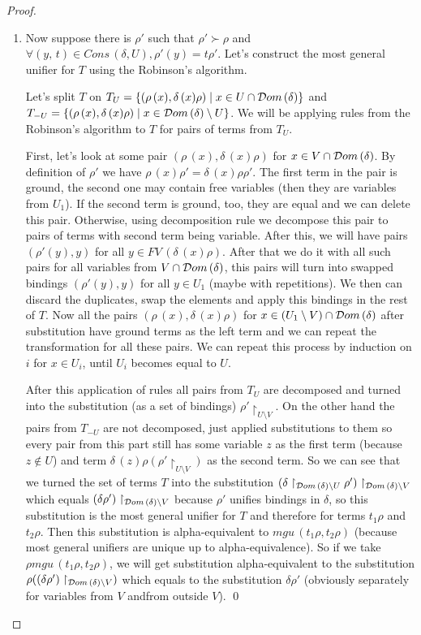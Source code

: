 \begin{proof}
\begin{enumerate}
\item Now suppose there is $\rho'$ such that $\rho' \succ \rho$ and $\forall (y, \, t) \in Cons\,(\delta, U), \rho'(y) = t \rho'$. Let's construct the most general unifier for $T$ using the Robinson's algorithm.

Let's split $T$ on $T_U = \{ (\rho\,(x), \delta\,(x) \rho) \mid x \in U \cap \mathcal{D}om\,(\delta) \}$ and $T_{-U} = \{ (\rho\,(x), \delta\,(x) \rho) \mid x \in  \mathcal{D}om\,(\delta) \setminus U \}$. We will be applying rules from the Robinson's algorithm to $T$ for pairs of terms from $T_U$.

First, let's look at some pair $(\rho\,(x), \delta\,(x) \rho)$ for $x \in V \cap \mathcal{D}om\,(\delta)$. By definition of $\rho'$ we have $\rho\,(x) \rho' = \delta\,(x) \rho \rho'$. The first term in the pair is ground, the second one may contain free variables (then they are variables from $U_1$). If the second term is ground, too, they are equal and we can delete this pair. Otherwise, using decomposition rule we decompose this pair to pairs of terms with second term being variable. After this, we will have pairs $(\rho'(y), y)$ for all $y \in FV\,(\delta\,(x) \rho)$. After that we do it with all such pairs for all variables from $V \cap \mathcal{D}om\,(\delta)$, this pairs will turn into swapped bindings $(\rho'(y), y)$ for all $y \in U_1$ (maybe with repetitions). We then can discard the duplicates, swap the elements and apply this bindings in the rest of $T$. Now all the pairs $(\rho\,(x), \delta\,(x) \rho)$ for $x \in (U_1 \setminus V) \cap \mathcal{D}om\,(\delta)$ after substitution have ground terms as the left term and we can repeat the transformation for all these pairs. We can repeat this process by induction on $i$ for $x \in U_i$, until $U_i$ becomes equal to $U$.

After this application of rules all pairs from $T_U$ are decomposed and turned into the substitution (as a set of bindings) $\rho'\restriction_{U \setminus V}$. On the other hand the pairs from $T_{-U}$  are not decomposed, just applied substitutions to them so every pair from this part still has some variable $z$ as the first term (because $z\not\in U$) and term $\delta\,(z) \rho (\rho'\restriction_{U \setminus V})$ as the second term. So we can see that we turned the set of terms $T$ into the substitution ${(\delta\restriction_{\mathcal{D}om\,(\delta) \setminus U} \rho')\restriction_{\mathcal{D}om\,(\delta) \setminus V}}$ which equals ${(\delta \rho')\restriction_{\mathcal{D}om\,(\delta) \setminus V}}$ because $\rho'$ unifies bindings in $\delta$, so this substitution is the most general unifier for $T$ and therefore for terms $t_1 \rho$ and $t_2 \rho$. Then this substitution is alpha-equivalent to $mgu\,(t_1 \rho, t_2 \rho)$ (because most general unifiers are unique up to alpha-equivalence). So if we take $\rho mgu\,(t_1 \rho, t_2 \rho)$, we will get substitution alpha-equivalent to the substitution ${\rho ((\delta \rho')\restriction_{\mathcal{D}om\,(\delta) \setminus V})}$ which equals to the substitution $\delta \rho'$ (obviously separately for variables from $V$ andfrom outside $V$).
\qed
 

\end{enumerate}
\end{proof}

